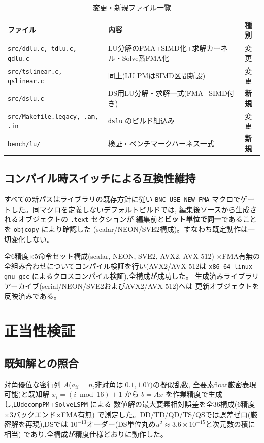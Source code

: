 \documentclass[a4j,dvipdfmx,11pt]{jsarticle}
\begin{document}
\begin{table}[htbp]
\centering
\caption{変更・新規ファイル一覧}
\label{tab:files}
\footnotesize
\begin{tabular}{lll}
\toprule
ファイル & 内容 & 種別 \\
\midrule
\texttt{src/ddlu.c, tdlu.c, qdlu.c} & LU分解のFMA+SIMD化+求解カーネル・Solve系FMA化 & 変更 \\
\texttt{src/tslinear.c, qslinear.c} & 同上(LU PMはSIMD区間新設) & 変更 \\
\texttt{src/dslu.c} & DS用LU分解・求解一式(FMA+SIMD付き) & \textbf{新規} \\
\texttt{src/Makefile.legacy, .am, .in} & \texttt{dslu} のビルド組込み & 変更 \\
\texttt{bench/lu/} & 検証・ベンチマークハーネス一式 & \textbf{新規} \\
\bottomrule
\end{tabular}
\end{table}

\subsection{コンパイル時スイッチによる互換性維持}

すべての新パスはライブラリの既存方針に従い \texttt{BNC\_USE\_NEW\_FMA}
マクロでゲートした。同マクロを定義しないデフォルトビルドでは,
編集後ソースから生成されるオブジェクトの \texttt{.text} セクションが
編集前と\textbf{ビット単位で同一}であることを \texttt{objcopy} により確認した
(scalar/NEON/SVE2構成)。すなわち既定動作は一切変化しない。

全6精度$\times$5命令セット構成(scalar, NEON, SVE2, AVX2, AVX-512)
$\times$FMA有無の全組み合わせについてコンパイル検証を行い(AVX2/AVX-512は
\texttt{x86\_64-linux-gnu-gcc} によるクロスコンパイル検証),全構成が成功した。
生成済みライブラリアーカイブ(serial/NEON/SVE2およびAVX2/AVX-512)へは
更新オブジェクトを反映済みである。

\section{正当性検証}

\subsection{既知解との照合}

対角優位な密行列 $A$($a_{ii}=n$,非対角は$[0.1, 1.07)$の擬似乱数,
全要素float厳密表現可能)と既知解 $x_i = (i \bmod 16) + 1$ から
$b = Ax$ を作業精度で生成し,\texttt{LUdecompPM}+\texttt{SolveLSPM} による
数値解の最大要素相対誤差を全36構成(6精度$\times$3バックエンド$\times$FMA有無)
で測定した。DD/TD/QD/TS/QSでは誤差ゼロ(厳密解を再現),DSでは
$10^{-13}$オーダー(DS単位丸め$u^2 \approx 3.6\times10^{-15}$と次元数の積に相当)
であり,全構成が精度仕様どおりに動作した。
\end{document}
